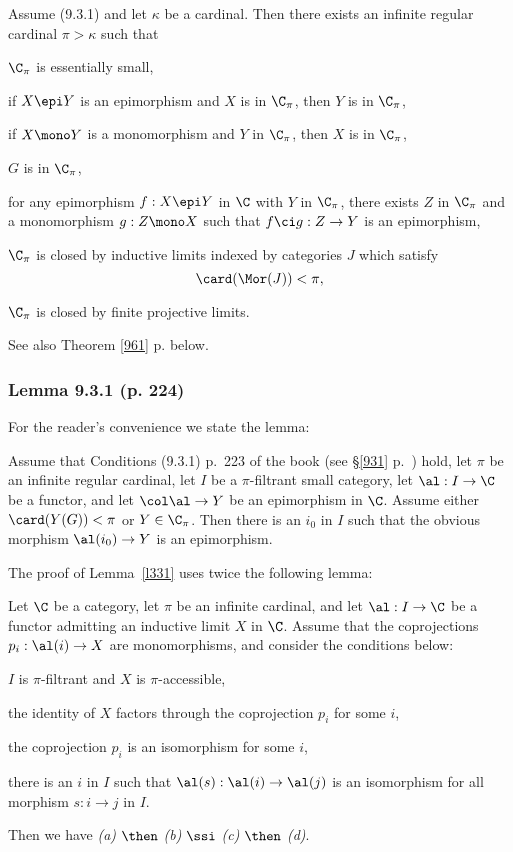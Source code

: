 \documentclass[12pt]{article}
\theoremstyle{remark}
\theoremstyle{definition}
\begin{document}
\begin{cor}[Corollary 9.3.8 p.~227]
Assume (9.3.1) and let $\kappa$ be a cardinal. Then there exists an infinite regular cardinal $\pi>\kappa$ such that 

 $\C_\pi$ is essentially small,

 if $X\epi Y$ is an epimorphism and $X$ is in $\C_\pi$, then $Y$ is in $\C_\pi$,

 if $X\mono Y$ is a monomorphism and $Y$ in $\C_\pi$, then $X$ is in $\C_\pi$,

 $G$ is in $\C_\pi$,

 for any epimorphism $f:X\epi Y$ in $\C$ with $Y$ in $\C_\pi$, there exists $Z$ in $\C_\pi$ and a monomorphism $g:Z\mono X$ such that $f\ci g:Z\to Y$ is an epimorphism,

 $\C_\pi$ is closed by inductive limits indexed by categories $J$ which satisfy $$\card(\Mor(J))<\pi,$$

 $\C_\pi$ is closed by finite projective limits.
\end{cor}

See also Theorem \ref{961} p.  below.

%

\subsubsection{Lemma 9.3.1 (p. 224)}

For the reader's convenience we state the lemma:

\begin{lem}[Lemma 9.3.1 p. 224]
Assume that Conditions (9.3.1) p.~223 of the book (see \S\ref{931} p.~) hold, let $\pi$ be an infinite regular cardinal, let $I$ be a $\pi$-filtrant small category, let $\al:I\to\C$ be a functor, and let $\col\al\to Y$ be an epimorphism in $\C$. Assume either $\card(Y(G))<\pi$ or $Y\in\C_\pi$. Then there is an $i_0$ in $I$ such that the obvious morphism $\al(i_0)\to Y$ is an epimorphism.
\end{lem}

The proof of Lemma~\ref{l331} uses twice the following lemma:

\begin{lem} 
Let $\C$ be a category, let $\pi$ be an infinite cardinal, and let $\al:I\to\C$ be a functor admitting an inductive limit $X$ in $\C$. Assume that the coprojections $p_i:\al(i)\to X$ are monomorphisms, and consider the conditions below:

 $I$ is $\pi$-filtrant and $X$ is $\pi$-accessible,

 the identity of $X$ factors through the coprojection $p_i$ for some $i$,

 the coprojection $p_i$ is an isomorphism for some $i$,

 there is an $i$ in $I$ such that $\al(s):\al(i)\to\al(j)$ is an isomorphism for all morphism $s:i\to j$ in $I$.

\nn Then we have {\em(a)} $\then$ {\em(b)} $\ssi$ {\em(c)} $\then$ {\em(d)}. 
\end{lem}
\end{document}
